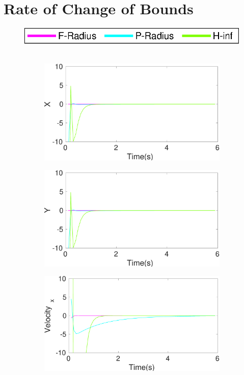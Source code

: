 \section{Rate of Change of Bounds}\label{eresult:rate}

\begin{figure}[h]
\includegraphics[scale=0.8]{figures/ratelegend}\\\\
\begin{subfigure}{.5\linewidth}
\centering
\includegraphics[width=\linewidth]{figures/BoundChange/CV/cv_bound_changeX}
\end{subfigure}
\begin{subfigure}{.5\linewidth}
\centering
\includegraphics[width=\linewidth]{figures/BoundChange/CV/cv_bound_changeY}
\end{subfigure}
\begin{subfigure}{.5\linewidth}
\centering
\includegraphics[width=\linewidth]{figures/BoundChange/CV/cv_bound_changeVelocity_x}

\end{subfigure}
\end{figure}
